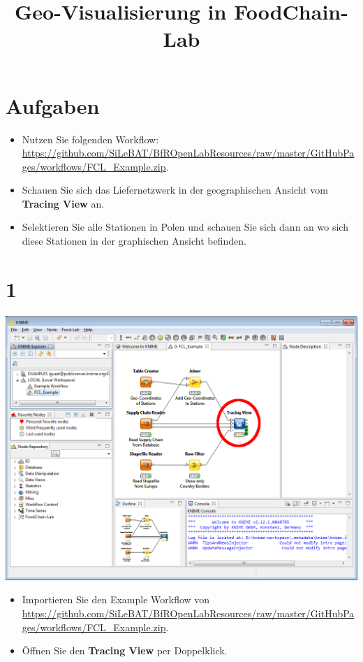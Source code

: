 \documentclass{beamer}
\title{Geo-Visualisierung in FoodChain-Lab}
\date{}
\begin{document}
\maketitle

\section{Aufgaben}
\begin{frame}
	\begin{itemize}
		\item Nutzen Sie folgenden Workflow: \url{https://github.com/SiLeBAT/BfROpenLabResources/raw/master/GitHubPages/workflows/FCL_Example.zip}.
		\item Schauen Sie sich das Liefernetzwerk in der geographischen Ansicht vom \textbf{Tracing View} an.
		\item Selektieren Sie alle Stationen in Polen und schauen Sie sich dann an wo sich diese Stationen in der graphischen Ansicht befinden.
	\end{itemize}
\end{frame}
 
\section{1}
\begin{frame}
	\begin{center}
  		\includegraphics[height=0.6\textheight]{1.png}
	\end{center}
	\begin{itemize}
		\item Importieren Sie den Example Workflow von \url{https://github.com/SiLeBAT/BfROpenLabResources/raw/master/GitHubPages/workflows/FCL_Example.zip}.
		\item Öffnen Sie den \textbf{Tracing View} per Doppelklick.
	\end{itemize}
\end{frame}
\end{document}
